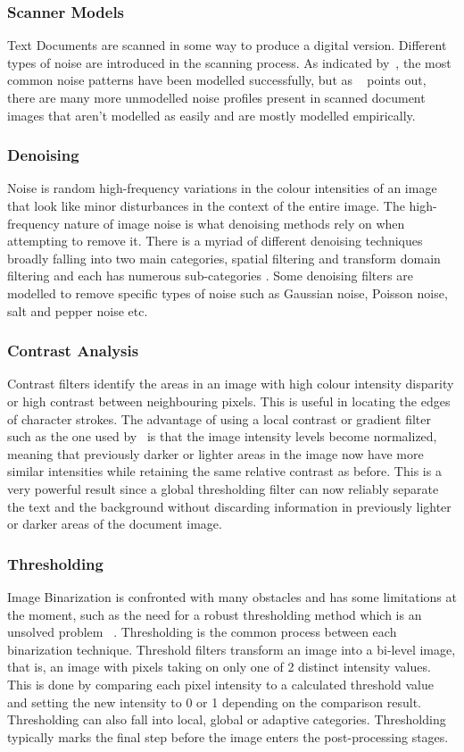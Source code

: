\documentclass[a4paper, 12pt]{report}
\begin{document}
\subsubsection{Scanner Models}
Text Documents are scanned in some way to produce a digital version. Different types of noise are introduced in the scanning process. As indicated by~\cite{smoaca2011id}, the most common noise patterns have been modelled successfully, but as ~\cite{eskenazi2016stability} points out, there are many more unmodelled noise profiles present in scanned document images that aren’t modelled as easily and are mostly modelled empirically.

\subsubsection{Denoising}
Noise is random high-frequency variations in the colour intensities of an image that look like minor disturbances in the context of the entire image. The high-frequency nature of image noise is what denoising methods rely on when attempting to remove it. There is a myriad of different denoising techniques broadly falling into two main categories, spatial filtering and transform domain filtering and each has numerous sub-categories \cite{motwani2004survey}.  Some denoising filters are modelled to remove specific types of noise such as Gaussian noise, Poisson noise, salt and pepper noise etc.

\subsubsection{Contrast Analysis}
Contrast filters identify the areas in an image with high colour intensity disparity or high contrast between neighbouring pixels. This is useful in locating the edges of character strokes. The advantage of using a local contrast or gradient filter such as the one used by~\cite{su2012robust} is that the image intensity levels become normalized, meaning that previously darker or lighter areas in the image now have more similar intensities while retaining the same relative contrast as before. This is a very powerful result since a global thresholding filter can now reliably separate the text and the background without discarding information in previously lighter or darker areas of the document image.

\subsubsection{Thresholding}
Image Binarization is confronted with many obstacles and has some limitations at the moment, such as the need for a robust thresholding method which is an unsolved problem ~\cite{su2012robust}. Thresholding is the common process between each binarization technique. Threshold filters transform an image into a bi-level image, that is, an image with pixels taking on only one of 2 distinct intensity values. This is done by comparing each pixel intensity to a calculated threshold value and setting the new intensity to 0 or 1 depending on the comparison result. Thresholding can also fall into local, global or adaptive categories. Thresholding typically marks the final step before the image enters the post-processing stages.
\end{document}
